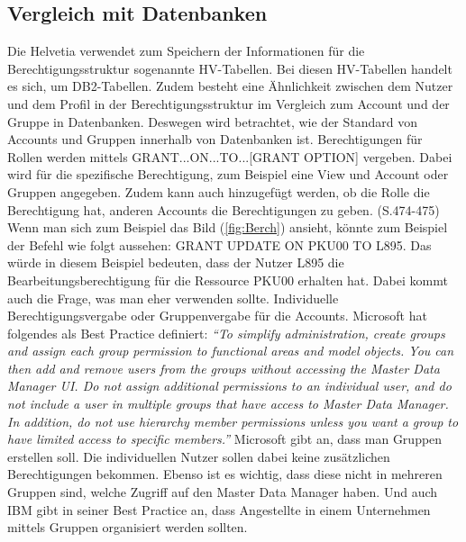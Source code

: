 \subsection{Vergleich mit Datenbanken}
\label{sec:chapter04:DB}
Die Helvetia verwendet zum Speichern der Informationen für die Berechtigungsstruktur sogenannte HV-Tabellen.
Bei diesen HV-Tabellen handelt es sich, um DB2-Tabellen.
Zudem besteht eine Ähnlichkeit zwischen dem Nutzer und dem Profil in der Berechtigungsstruktur im Vergleich zum Account und der Gruppe in Datenbanken.
Deswegen wird betrachtet, wie der Standard von Accounts und Gruppen innerhalb von Datenbanken ist.
\newline
Berechtigungen für Rollen werden mittels GRANT...ON...TO...[GRANT OPTION] vergeben.
Dabei wird für die spezifische Berechtigung, zum Beispiel eine View und Account oder Gruppen angegeben.
Zudem kann auch hinzugefügt werden, ob die Rolle die Berechtigung hat, anderen Accounts die Berechtigungen zu geben.\cite{Ram09} (S.474-475)
\newline
Wenn man sich zum Beispiel das Bild (\ref{fig:Berch}) ansieht, könnte zum Beispiel der Befehl wie folgt aussehen:
\newline
\newline
GRANT UPDATE ON PKU00 TO L895.
\newline
\newline
Das würde in diesem Beispiel bedeuten, dass der Nutzer L895 die Bearbeitungsberechtigung für die Ressource PKU00 erhalten hat.
Dabei kommt auch die Frage, was man eher verwenden sollte.
Individuelle Berechtigungsvergabe oder Gruppenvergabe für die Accounts.
Microsoft hat folgendes als Best Practice definiert:
\newline
\newline
\textit{"`To simplify administration, create groups and assign each group permission to functional areas and model objects.
You can then add and remove users from the groups without accessing the Master Data Manager UI.
\newline
\newline
Do not assign additional permissions to an individual user, and do not include a user in multiple groups that have access to Master Data Manager. In addition, do not use hierarchy member permissions unless you want a group to have limited access to specific members."'} \cite{Micro}
\newline
\newline
Microsoft gibt an, dass man Gruppen erstellen soll.
Die individuellen Nutzer sollen dabei keine zusätzlichen Berechtigungen bekommen.
Ebenso ist es wichtig, dass diese nicht in mehreren Gruppen sind, welche Zugriff auf den Master Data Manager haben.
Und auch IBM gibt in seiner Best Practice an, dass Angestellte in einem Unternehmen mittels Gruppen organisiert werden sollten. \cite{IBMGroup}

